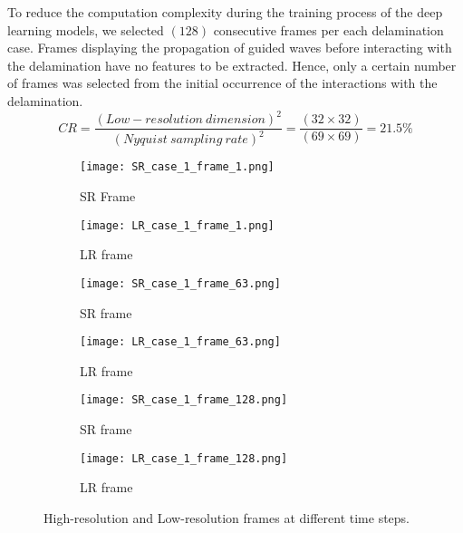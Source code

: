 To reduce the computation complexity during the training process of the deep learning models, we selected \((128)\) consecutive frames per each delamination case.
Frames displaying the propagation of guided waves before interacting with the delamination have no features to be extracted. 
Hence, only a certain number of frames was selected from the initial occurrence of the interactions with the delamination.
\begin{equation}
	CR = \frac{(Low-resolution\ dimension)^2}{(Nyquist\ sampling\ rate)^2} = \frac{(32\times32)}{(69\times69)}=21.5\%
	\label{CR}
\end{equation}
\begin{figure} [!h]
	\centering
	\begin{subfigure}[b]{.48\textwidth}
		\centering
		\texttt{[image: SR\_case\_1\_frame\_1.png]}
		\caption{SR Frame}
		\label{fig:SR_1}
	\end{subfigure}
	\hfill
	\begin{subfigure}[b]{.48\textwidth}
		\centering
		\texttt{[image: LR\_case\_1\_frame\_1.png]}
		\caption{LR frame}
		\label{fig:LR_1}	
	\end{subfigure}
	\hfill
		\begin{subfigure}[b]{.48\textwidth}
		\centering
		\texttt{[image: SR\_case\_1\_frame\_63.png]}
		\caption{SR frame}
		\label{fig:SR_2}
	\end{subfigure}
	\hfill
	\begin{subfigure}[b]{.48\textwidth}
		\centering
		\texttt{[image: LR\_case\_1\_frame\_63.png]}
		\caption{LR frame}
		\label{fig:LR_2}	
	\end{subfigure}
	\hfill
		\begin{subfigure}[b]{.48\textwidth}
		\centering
		\texttt{[image: SR\_case\_1\_frame\_128.png]}
		\caption{SR frame}
		\label{fig:SR_3}
	\end{subfigure}
	\hfill
	\begin{subfigure}[b]{.48\textwidth}
		\centering
		\texttt{[image: LR\_case\_1\_frame\_128.png]}
		\caption{LR frame}
		\label{fig:LR_3}	
	\end{subfigure}
	\caption{High-resolution and Low-resolution frames at different time steps.}
	\label{fig:SR_LR}
\end{figure}
\newpage